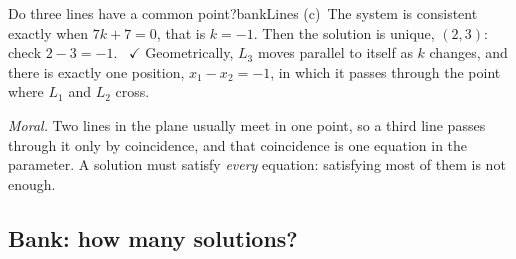 \documentclass[11pt]{article}
\begin{document}
\begin{exmp}{Do three lines have a common point?}{bankLines}
(c)~The system is consistent exactly when $7k+7=0$, that is $k=-1$. Then the solution is unique, $(2,3)$: check $2-3=-1$. \ $\checkmark$ Geometrically, $L_3$ moves parallel to itself as $k$ changes, and there is exactly one position, $x_1-x_2=-1$, in which it passes through the point where $L_1$ and $L_2$ cross.

\emph{Moral.} Two lines in the plane usually meet in one point, so a third line passes through it only by coincidence, and that coincidence is one equation in the parameter. A solution must satisfy \emph{every} equation: satisfying most of them is not enough.
\end{exmp}

\subsection*{Bank: how many solutions?}
\end{document}
